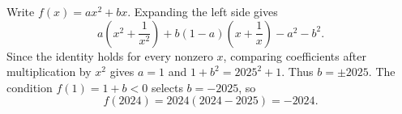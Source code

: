 Write $f(x)=ax^2+bx$. Expanding the left side gives
\[
a\left(x^2+\dfrac{1}{x^2}\right)+b(1-a)\left(x+\dfrac{1}{x}\right)-a^2-b^2.
\]
Since the identity holds for every nonzero $x$, comparing coefficients after multiplication by $x^2$ gives $a=1$ and $1+b^2=2025^2+1$. Thus $b=\pm2025$. The condition $f(1)=1+b<0$ selects $b=-2025$, so
\[
f(2024)=2024(2024-2025)=\boxed{-2024}.
\]
